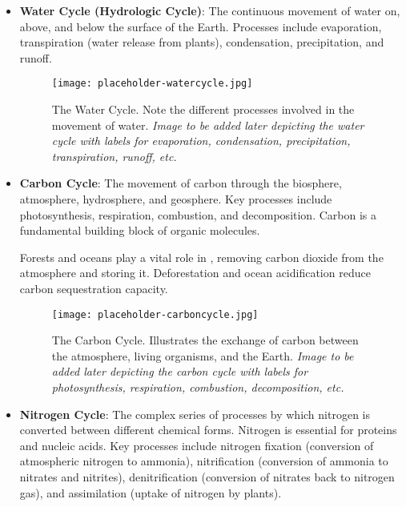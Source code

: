 \begin{itemize}
    \item \textbf{Water Cycle (Hydrologic Cycle)}:  The continuous movement of water on, above, and below the surface of the Earth.  Processes include evaporation, transpiration (water release from plants), condensation, precipitation, and runoff.

    \begin{figure}[h]
        \texttt{[image: placeholder-watercycle.jpg]}
        \caption{The Water Cycle.  Note the different processes involved in the movement of water. \textit{Image to be added later depicting the water cycle with labels for evaporation, condensation, precipitation, transpiration, runoff, etc.}}
    \end{figure}

    \item \textbf{Carbon Cycle}:  The movement of carbon through the biosphere, atmosphere, hydrosphere, and geosphere.  Key processes include photosynthesis, respiration, combustion, and decomposition.  Carbon is a fundamental building block of organic molecules.

    \begin{marginnote}
      Forests and oceans play a vital role in , removing carbon dioxide from the atmosphere and storing it.  Deforestation and ocean acidification reduce carbon sequestration capacity.
    \end{marginnote}

    \begin{figure}[h]
        \texttt{[image: placeholder-carboncycle.jpg]}
        \caption{The Carbon Cycle.  Illustrates the exchange of carbon between the atmosphere, living organisms, and the Earth. \textit{Image to be added later depicting the carbon cycle with labels for photosynthesis, respiration, combustion, decomposition, etc.}}
    \end{figure}

    \item \textbf{Nitrogen Cycle}: The complex series of processes by which nitrogen is converted between different chemical forms. Nitrogen is essential for proteins and nucleic acids. Key processes include nitrogen fixation (conversion of atmospheric nitrogen to ammonia), nitrification (conversion of ammonia to nitrates and nitrites), denitrification (conversion of nitrates back to nitrogen gas), and assimilation (uptake of nitrogen by plants).


\end{itemize}
